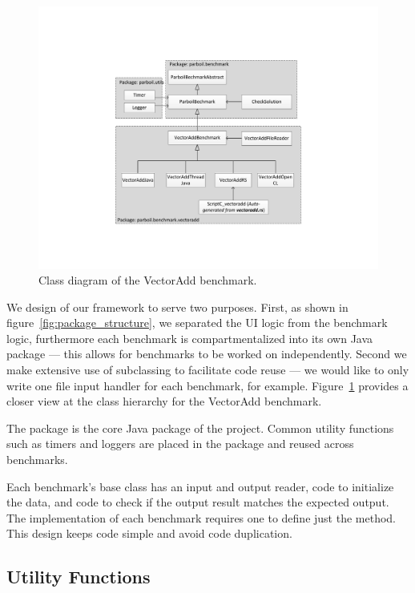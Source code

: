 \begin{figure}
\centering
\includegraphics[scale=0.5]{figs/vectoradd_class_diagram.pdf}
\caption{Class diagram of the VectorAdd benchmark.}
\label{fig:class_diagram}
\centering
\end{figure}

We design of our framework to serve two purposes.
First, as shown in figure~\ref{fig:package_structure}, we separated the UI logic from the benchmark logic, furthermore each benchmark is compartmentalized into its own Java package --- this allows for benchmarks to be worked on independently.
Second we make extensive use of subclassing to facilitate code reuse --- 
	we would like to only write one file input handler for each benchmark,
	for example.
Figure~\ref{fig:class_diagram} provides a closer
view at the class hierarchy for the VectorAdd benchmark.

The  package is the core Java package of the project.
Common utility functions such as timers and loggers are placed in the  package and reused across benchmarks.

Each benchmark's base class has an input and output reader, code to
	initialize the data, and code to check if the output result matches
	the expected output.
The implementation of each benchmark requires one to define just the 
	method.
This design keeps code simple and avoid code duplication.


\subsection{Utility Functions}

